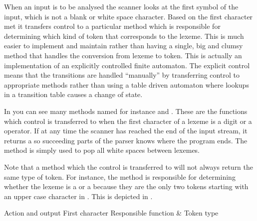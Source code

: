 When an input is to be analysed the scanner looks at the first symbol
of the input, which is not a blank or white space character. Based on
the first character met it transfers control to a particular method which is responsible for determining which kind of token that corresponds to the lexeme. This is much easier to implement and maintain rather than having a single, big and clumsy method that handles the conversion from lexeme to token.
This is actually an implementation of an explicitly controlled finite automaton\cite{explicitcontrolledfinitautomaton}. 
The explicit control means that the transitions are handled
``manually'' by transferring control to appropriate methods rather than using a table driven automaton where lookups in a transition table causes a change of state.

In  you can see many methods named 
 for instance 
and . These are the functions which control is 
transferred to when the first character of a lexeme is a digit or a operator. 
If at any time the scanner has reached the end of
the input stream, it returns a  so succeeding parts of the
parser knows where the program ends. 
The method  is simply used to pop all white spaces between lexemes.

Note that a method which the control is transferred to will not always return the same type of token. 
For instance, the method  is responsible
for determining whether the lexeme is a  or a
 because they are the only two tokens starting
with an upper case character in \productname{}. This is depicted in
. 

                         {Action and output					            }
       {First character	}{Responsible function	& Token type				    }{
}

